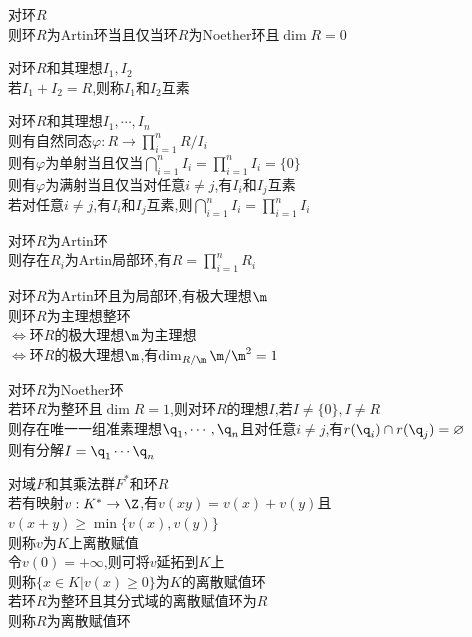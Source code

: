 \begin{dingli}
对环$R$\\
则环$R$为Artin环当且仅当环$R$为Noether环且$\dim R=0$
\end{dingli}

\begin{dingyi}
对环$R$和其理想$I_1,I_2$\\
若$I_1+I_2=R$,则称$I_1$和$I_2$互素
\end{dingyi}

\begin{dingli}
对环$R$和其理想$I_1,\cdots,I_n$\\
则有自然同态$\varphi:R\to\prod\limits_{i=1}^{n}R/I_i$\\
则有$\varphi$为单射当且仅当$\bigcap\limits_{i=1}^{n}I_i=\prod\limits_{i=1}^{n}I_i=\{0\}$\\
则有$\varphi$为满射当且仅当对任意$i\neq j$,有$I_i$和$I_j$互素\\
若对任意$i\neq j$,有$I_i$和$I_j$互素,则$\bigcap\limits_{i=1}^{n}I_i=\prod\limits_{i=1}^{n}I_i$
\end{dingli}

\begin{dingli}
对环$R$为Artin环\\
则存在$R_i$为Artin局部环,有$R=\prod\limits_{i=1}^{n}R_i$
\end{dingli}

\begin{dingli}
对环$R$为Artin环且为局部环,有极大理想$\m$\\
则环$R$为主理想整环\\
$\Leftrightarrow$环$R$的极大理想$\m$为主理想\\
$\Leftrightarrow$环$R$的极大理想$\m$,有$\dim_{R/\m}\m/\m^2=1$
\end{dingli}

\begin{dingyi}
对环$R$为Noether环\\
若环$R$为整环且$\dim R=1$,则对环$R$的理想$I$,若$I\neq\{0\},I\neq R$\\
则存在唯一一组准素理想$\q_1,\cdots,\q_n$且对任意$i\neq j$,有$r(\q_i)\cap r(\q_j)=\varnothing$\\
则有分解$I=\q_1\cdots\q_n$
\end{dingyi}

\begin{dingyi}
对域$F$和其乘法群$F^{*}$和环$R$\\
若有映射$v:K^{*}\to \Z$,有$v(xy)=v(x)+v(y)$且$v(x+y)\geq \min\{v(x),v(y)\}$\\
则称$v$为$K$上离散赋值\\
令$v(0)=+\infty$,则可将$v$延拓到$K$上\\
则称$\{x\in K|v(x)\geq 0\}$为$K$的离散赋值环\\
若环$R$为整环且其分式域的离散赋值环为$R$\\
则称$R$为离散赋值环
\end{dingyi}

